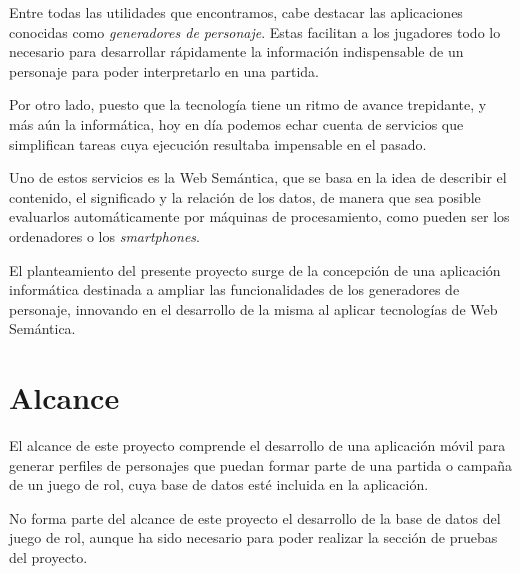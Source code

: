 Entre todas las utilidades que encontramos, cabe destacar las aplicaciones 
conocidas como \textit{generadores de personaje}. Estas facilitan a los 
jugadores todo lo necesario para desarrollar rápidamente la información 
indispensable de un personaje para poder interpretarlo en una partida. \medskip

Por otro lado, puesto que la tecnología tiene un ritmo de avance trepidante, 
y más aún la informática, hoy en día podemos echar cuenta de servicios 
que simplifican tareas cuya ejecución resultaba impensable en el pasado.
\medskip

Uno de estos servicios es la Web Semántica, que se basa en la idea de 
describir el contenido, el significado y la relación 
de los datos, de manera que sea posible evaluarlos automáticamente por 
máquinas de procesamiento, como pueden ser los ordenadores o los 
\textit{smartphones}.
\medskip

El planteamiento del presente proyecto surge de la concepción de una 
aplicación informática destinada a ampliar las funcionalidades de 
los generadores de personaje, innovando en el desarrollo de la misma 
al aplicar tecnologías de Web Semántica.\medskip


\section{Alcance}
El alcance de este proyecto comprende el desarrollo de una 
aplicación móvil para generar perfiles de personajes que 
puedan formar parte de una partida o campaña de un juego 
de rol, cuya base de datos esté incluida en la aplicación. \medskip

No forma parte del alcance de este proyecto el desarrollo 
de la base de datos del juego de rol, aunque ha sido 
necesario para poder realizar la sección de pruebas del
proyecto.

